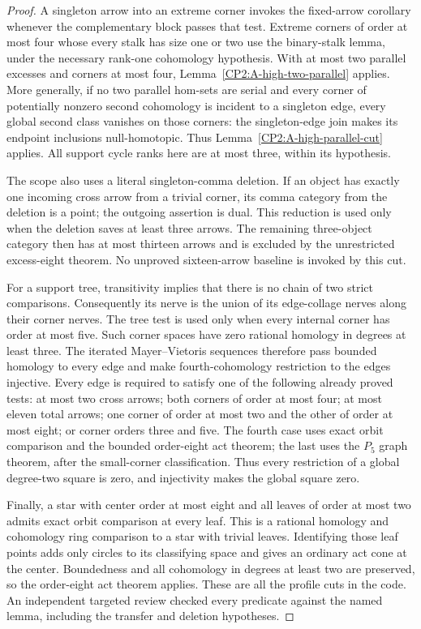 \begin{proof}
A singleton arrow into an extreme corner invokes the
fixed-arrow corollary whenever the complementary block
passes that test.  Extreme corners of order at most four
whose every stalk has size one or two use the binary-stalk
lemma, under the necessary rank-one cohomology hypothesis.
With at most two parallel excesses and corners at most
four, Lemma~\ref{CP2:A-high-two-parallel} applies.  More
generally, if no two parallel hom-sets are serial and every
corner of potentially nonzero second cohomology is incident
to a singleton edge, every global second class vanishes on
those corners: the singleton-edge join makes its endpoint
inclusions null-homotopic.  Thus
Lemma~\ref{CP2:A-high-parallel-cut} applies.  All support
cycle ranks here are at most three, within its hypothesis.

The scope also uses a literal singleton-comma deletion.
If an object has exactly one incoming cross arrow from a
trivial corner, its comma category from the deletion is a
point; the outgoing assertion is dual.  This reduction is
used only when the deletion saves at least three arrows.
The remaining three-object category then has at most
thirteen arrows and is excluded by the unrestricted
excess-eight theorem.  No unproved sixteen-arrow baseline
is invoked by this cut.

For a support tree, transitivity implies that there is no
chain of two strict comparisons.  Consequently its nerve
is the union of its edge-collage nerves along their corner
nerves.  The tree test is used only when every internal
corner has order at most five.  Such corner spaces have
zero rational homology in degrees at least three.  The
iterated Mayer--Vietoris sequences therefore pass bounded
homology to every edge and make fourth-cohomology
restriction to the edges injective.  Every edge is
required to satisfy one of the following already proved
tests: at most two cross arrows; both corners of order at
most four; at most eleven total arrows; one corner of order
at most two and the other of order at most eight; or corner
orders three and five.  The fourth case uses exact orbit
comparison and the bounded order-eight act theorem; the
last uses the $P_5$ graph theorem, after the small-corner
classification.  Thus every restriction of a global
degree-two square is zero, and injectivity makes the
global square zero.

Finally, a star with center order at most eight and all
leaves of order at most two admits exact orbit comparison
at every leaf.  This is a rational homology and cohomology
ring comparison to a star with trivial leaves.  Identifying
those leaf points adds only circles to its classifying
space and gives an ordinary act cone at the center.
Boundedness and all cohomology in degrees at least two
are preserved, so the order-eight act theorem applies.
These are all the profile cuts in the code.  An independent
targeted review checked every predicate against the named
lemma, including the transfer and deletion hypotheses.


\end{proof}
